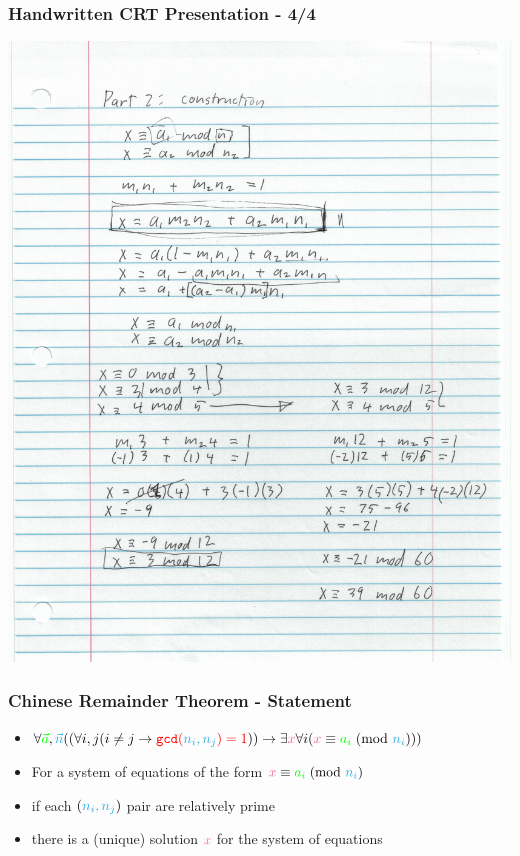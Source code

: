 \documentclass[aspectratio=169]{beamer}
\begin{document}
\begin{frame}[fragile]
\frametitle{Handwritten CRT Presentation - 4/4}
\includegraphics[height=0.8\paperheight]{jacques_page4.jpg}
\end{frame}


\begin{frame}[fragile]
\frametitle{Chinese Remainder Theorem - Statement}
\begin{itemize}
\item $\forall {\color{green}\vec{a}}, {\color{cybercyan}\vec{n}}((\forall i,j(i \neq j \rightarrow {\color{red}\verb|gcd|({\color{cybercyan}n_i, n_j}) = 1})) \rightarrow \exists {\color{cyberpink}x} \forall i({\color{cyberpink}x} \equiv {\color{green}a_i}\hspace{1mm}(\text{mod }{\color{cybercyan}n_i})))$
\item For a system of equations of the form ${\color{cyberpink}x} \equiv {\color{green}a_i}\hspace{1mm}(\text{mod }{\color{cybercyan}n_i})$
\item if each $({\color{cybercyan}n_i, n_j})$ pair are {\color{red}relatively prime}
\item there is a (unique) solution ${\color{cyberpink}x}$ for the system of equations
\end{itemize}
\end{frame}
\end{document}
